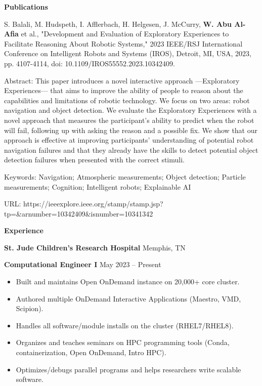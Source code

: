 \documentclass[11pt]{article}
\begin{document}
\begin{center}
    \textbf{Publications}
\end{center}

S. Balali, M. Hudspeth, I. Afflerbach, H. Helgesen, J. McCurry, \textbf{W. Abu Al-Afia} et al., "Development and Evaluation of Exploratory Experiences to Facilitate Reasoning About Robotic Systems," 2023 IEEE/RSJ International Conference on Intelligent Robots and Systems (IROS), Detroit, MI, USA, 2023, pp. 4107-4114, doi: 10.1109/IROS55552.2023.10342409.

\vspace{6pt}

Abstract: This paper introduces a novel interactive approach —Exploratory Experiences— that aims to improve the ability of people to reason about the capabilities and limitations of robotic technology. We focus on two areas: robot navigation and object detection. We evaluate the Exploratory Experiences with a novel approach that measures the participant's ability to predict when the robot will fail, following up with asking the reason and a possible fix. We show that our approach is effective at improving participants' understanding of potential robot navigation failures and that they already have the skills to detect potential object detection failures when presented with the correct stimuli. 

\vspace{6pt}

Keywords: Navigation; Atmospheric measurements; Object detection; Particle measurements; Cognition; Intelligent robots; Explainable AI

\vspace{6pt}

URL: https://ieeexplore.ieee.org/stamp/stamp.jsp?tp=\&arnumber=10342409\&isnumber=10341342


\vspace{12pt}
\pagebreak

\begin{center}
    \textbf{Experience}
\end{center}
\textbf{St. Jude Children's Research Hospital} \hfill Memphis, TN
 
\textbf{Computational Engineer I} \hfill May 2023 – Present
\begin{itemize}[noitemsep]
    \item Built and maintains Open OnDemand instance on 20,000+ core cluster.
    \item Authored multiple OnDemand Interactive Applications (Maestro, VMD, Scipion).
    \item Handles all software/module installs on the cluster (RHEL7/RHEL8).
    \item Organizes and teaches seminars on HPC programming tools (Conda, containerization, Open OnDemand, Intro HPC).
    \item Optimizes/debugs parallel programs and helps researchers write scalable software.
\end{itemize}
\end{document}
